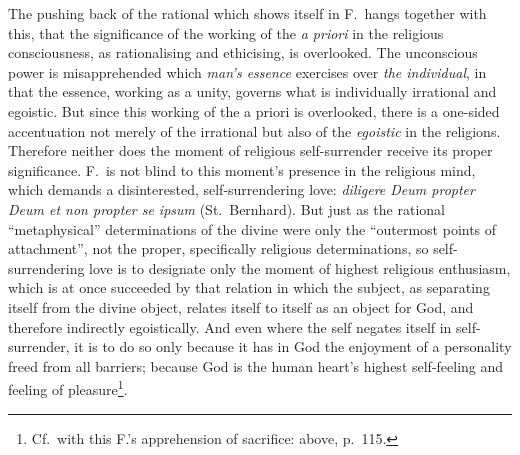 \documentclass[12pt,a4paper]{book}
\begin{document}
The pushing back of the rational which shows itself in F.\ hangs together with
this, that the significance of the working of the \emph{a priori} in the
religious consciousness, as rationalising and ethicising, is overlooked. The
unconscious power is misapprehended which \emph{man's essence} exercises over
\emph{the individual}, in that the essence, working as a unity, governs what
is individually irrational and egoistic. But since this working of the a
priori is overlooked, there is a one-sided accentuation not merely of the
irrational but also of the \emph{egoistic} in the religions. Therefore neither
does the moment of religious self-surrender receive its proper significance.
F.\ is not blind to this moment's presence in the religious mind, which
demands a disinterested, self-surrendering love: \textit{diligere Deum propter
Deum et non propter se ipsum} (St.\ Bernhard). But just as the rational
``metaphysical'' determinations of the divine were only the ``outermost points
of attachment'', not the proper, specifically religious determinations, so
self-surrendering love is to designate only the moment of highest religious
enthusiasm, which is at once succeeded by that relation in which the subject,
as separating itself from the divine object, relates itself to itself as an
object for God, and therefore indirectly egoistically. And even where the self
negates itself in self-surrender, it is to do so only because it has in God
the enjoyment of a personality freed from all barriers; because God is the
human heart's highest self-feeling and feeling of pleasure\footnote{Cf.\ with
this F.'s apprehension of sacrifice: above, p.\ 115.}.
\end{document}
